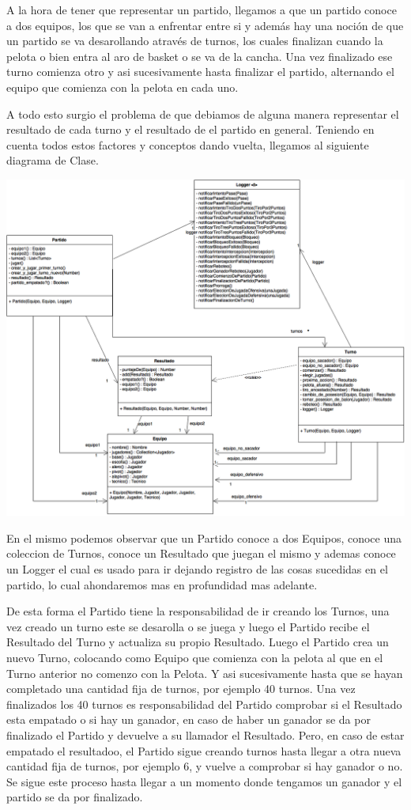 A la hora de tener que representar un partido, llegamos a que un partido conoce a dos equipos, los que se van a enfrentar entre si y además hay una noción de que un partido se va desarollando através de turnos, los cuales finalizan cuando la pelota o bien entra al aro de basket o se va de la cancha. Una vez finalizado ese turno comienza otro y asi sucesivamente hasta finalizar el partido, alternando el equipo que comienza con la pelota en cada uno.

A todo esto surgio el problema de que debiamos de alguna manera representar el resultado de cada turno y el resultado de el partido en general. Teniendo en cuenta todos estos factores y conceptos dando vuelta, llegamos al siguiente diagrama de Clase.

\begin{center}
    \includegraphics[scale=0.35]{imagenes/clases-partido.png}
\end{center}

En el mismo podemos observar que un Partido conoce a dos Equipos, conoce una coleccion de Turnos, conoce un Resultado que juegan el mismo y ademas conoce un Logger el cual es usado para ir dejando registro de las cosas sucedidas en el partido, lo cual ahondaremos mas en profundidad mas adelante.

De esta forma el Partido tiene la responsabilidad de ir creando los Turnos, una vez creado un turno este se desarolla o se juega y luego el Partido recibe el Resultado del Turno y actualiza su propio Resultado. Luego el Partido crea un nuevo Turno, colocando como Equipo que comienza con la pelota al que en el Turno anterior no comenzo con la Pelota. Y asi sucesivamente hasta que se hayan completado una cantidad fija de turnos, por ejemplo 40 turnos.
Una vez finalizados los 40 turnos es responsabilidad del Partido comprobar si el Resultado esta empatado o si hay un ganador, en caso de haber un ganador se da por finalizado el Partido y devuelve a su llamador el Resultado.
Pero, en caso de estar empatado el resultadoo, el Partido sigue creando turnos hasta llegar a otra nueva cantidad fija de turnos, por ejemplo 6, y vuelve a comprobar si hay ganador o no. Se sigue este proceso hasta llegar a un momento donde tengamos un ganador y el partido se da por finalizado.

